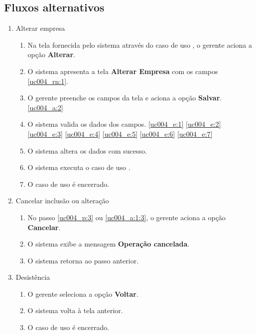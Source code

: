\subsection{Fluxos alternativos}

\begin{enumerate}[label=A\arabic*]
	\item Alterar empresa \label{uc004_a:1}
	\begin{enumerate}[label*=.\arabic*]
		\item Na tela fornecida pelo sistema através do caso de uso , o gerente aciona a opção \textbf{Alterar}. 
		\item O sistema apresenta a tela \textbf{Alterar Empresa} com os campos \ref{uc004_rn:1}. \label{uc004_a:1:2}
		\item O gerente preenche os campos da tela e aciona a opção \textbf{Salvar}. \label{uc004_a:1:3} \ref{uc004_a:2}
		\item O sistema valida os dados dos campos. \ref{uc004_e:1} \ref{uc004_e:2} \ref{uc004_e:3} \ref{uc004_e:4} \ref{uc004_e:5} \ref{uc004_e:6} \ref{uc004_e:7}
		\item O sistema altera os dados com sucesso.
		\item O sistema executa o caso de uso .
		\item O caso de uso é encerrado.
	\end{enumerate}
	
	\item Cancelar inclusão ou alteração \label{uc004_a:2}
	\begin{enumerate}[label*=.\arabic*]
		\item No passo \ref{uc004_p:3} ou \ref{uc004_a:1:3}, o gerente aciona a opção \textbf{Cancelar}.
		\item O sistema exibe a mensagem \textbf{Operação cancelada}.
		\item O sistema retorna ao passo anterior.
	\end{enumerate}
	
	\item Desistência
	\begin{enumerate}[label*=.\arabic*]
		\item O gerente seleciona a opção \textbf{Voltar}.
		\item O sistema volta à tela anterior.
		\item O caso de uso é encerrado.		
	\end{enumerate}		 	
\end{enumerate}


